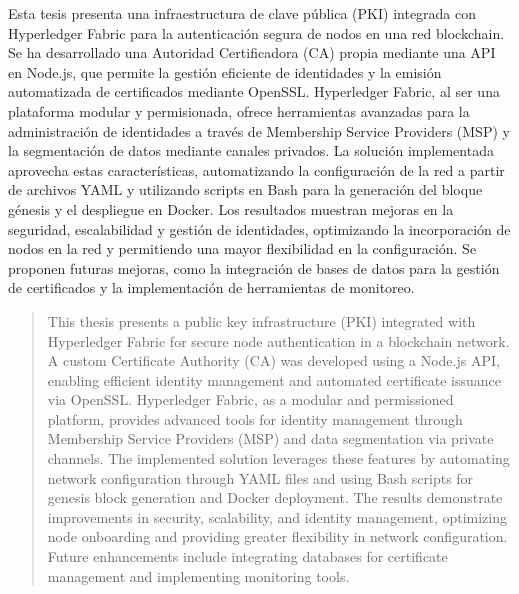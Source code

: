 \begin{resumen}
	Esta tesis presenta una infraestructura de clave pública (PKI) integrada con Hyperledger Fabric para la autenticación segura de nodos en una red blockchain. Se ha desarrollado una Autoridad Certificadora (CA) propia mediante una API en Node.js, que permite la gestión eficiente de identidades y la emisión automatizada de certificados mediante OpenSSL. Hyperledger Fabric, al ser una plataforma modular y permisionada, ofrece herramientas avanzadas para la administración de identidades a través de Membership Service Providers (MSP) y la segmentación de datos mediante canales privados. La solución implementada aprovecha estas características, automatizando la configuración de la red a partir de archivos YAML y utilizando scripts en Bash para la generación del bloque génesis y el despliegue en Docker. Los resultados muestran mejoras en la seguridad, escalabilidad y gestión de identidades, optimizando la incorporación de nodos en la red y permitiendo una mayor flexibilidad en la configuración. Se proponen futuras mejoras, como la integración de bases de datos para la gestión de certificados y la implementación de herramientas de monitoreo.
	
\end{resumen}

\begin{abstract}
	This thesis presents a public key infrastructure (PKI) integrated with Hyperledger Fabric for secure node authentication in a blockchain network. A custom Certificate Authority (CA) was developed using a Node.js API, enabling efficient identity management and automated certificate issuance via OpenSSL. Hyperledger Fabric, as a modular and permissioned platform, provides advanced tools for identity management through Membership Service Providers (MSP) and data segmentation via private channels. The implemented solution leverages these features by automating network configuration through YAML files and using Bash scripts for genesis block generation and Docker deployment. The results demonstrate improvements in security, scalability, and identity management, optimizing node onboarding and providing greater flexibility in network configuration. Future enhancements include integrating databases for certificate management and implementing monitoring tools.
	
\end{abstract}